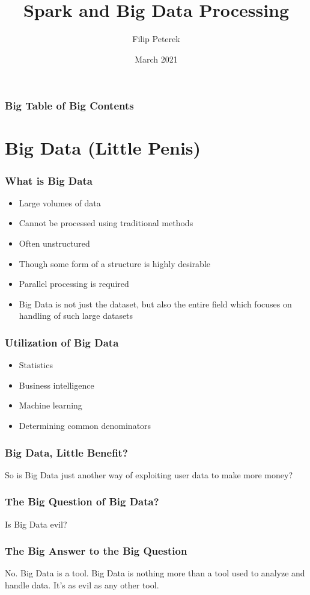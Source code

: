 \documentclass{beamer}
\title{Spark and Big Data Processing}
\author{Filip Peterek}
\institute{Technical University of Ostrava}
\date{March 2021}
\begin{document}
\frame{\titlepage}

\begin{frame}
\frametitle{Big Table of Big Contents}
\tableofcontents
\end{frame}

\section{Big Data (Little Penis)}

\begin{frame}
\frametitle{What is Big Data}

\begin{itemize}
    \item Large volumes of data
    \item Cannot be processed using traditional methods
    \item Often unstructured
    \item Though some form of a structure is highly desirable
    \item Parallel processing is required
    \item Big Data is not just the dataset, but also the entire field which focuses on handling of such large datasets
\end{itemize}

\end{frame}

\begin{frame}
\frametitle{Utilization of Big Data}

\begin{itemize}
    \item Statistics
    \item Business intelligence
    \item Machine learning
    \item Determining common denominators
\end{itemize}

\end{frame}

\begin{frame}
\frametitle{Big Data, Little Benefit?}
So is Big Data just another way of exploiting user data to make more money?
\end{frame}

\begin{frame}
\frametitle{The Big Question of Big Data?}
Is Big Data evil?
\end{frame}

\begin{frame}
\frametitle{The Big Answer to the Big Question}
No. \pause Big Data is a tool. \pause Big Data is nothing more than a tool used to analyze and handle data. It's as evil as any
other tool.
\end{frame}
\end{document}
